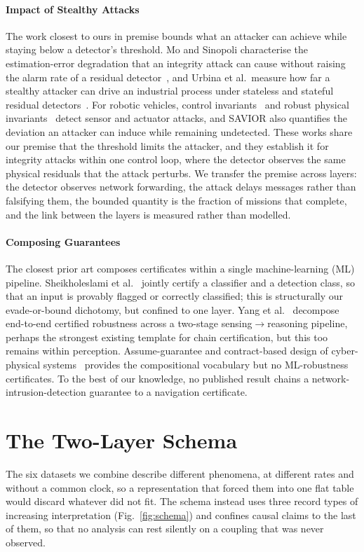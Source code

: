 \documentclass[conference,letterpaper,10pt]{IEEEtran}   %
\begin{document}
\paragraph{Impact of Stealthy Attacks}
The work closest to ours in premise bounds what an attacker can achieve while
staying below a detector's threshold. Mo and Sinopoli characterise the
estimation-error degradation that an integrity attack can cause without raising
the alarm rate of a residual detector~\cite{mo2016}, and Urbina et
al.\ measure how far a stealthy attacker can drive an industrial process under
stateless and stateful residual detectors~\cite{urbina2016}. For robotic
vehicles, control invariants~\cite{choi2018} and robust physical
invariants~\cite{quinonez2020savior} detect sensor and actuator attacks, and
SAVIOR also quantifies the deviation an attacker can induce while remaining
undetected. These works share our premise that the threshold limits the
attacker, and they establish it for integrity attacks within one control loop,
where the detector observes the same physical residuals that the attack
perturbs. We transfer the premise across layers: the detector observes network
forwarding, the attack delays messages rather than falsifying them, the bounded
quantity is the fraction of missions that complete, and the link between the
layers is measured rather than modelled.

\paragraph{Composing Guarantees}
The closest prior art composes certificates within a single machine-learning
(ML) pipeline.
Sheikholeslami et al.~\cite{sheikholeslami2021provably} jointly certify a
classifier and a detection class, so that an input is provably flagged or
correctly classified; this is structurally our evade-or-bound dichotomy, but
confined to one layer. Yang et al.~\cite{yang2022sensing} decompose end-to-end
certified robustness across a two-stage sensing$\to$reasoning pipeline, perhaps
the strongest existing template for chain certification, but this too remains
within perception. Assume-guarantee and contract-based design of
cyber-physical systems~\cite{pacti2024} provides the compositional vocabulary
but no ML-robustness certificates. To the best of our knowledge, no published
result chains a network-intrusion-detection guarantee to a navigation
certificate.

\section{The Two-Layer Schema}
\label{sec:schema}
The six datasets we combine describe different phenomena, at different rates
and without a common clock, so a representation that forced them into one flat
table would discard whatever did not fit. The schema instead uses three record
types of increasing interpretation (Fig.~\ref{fig:schema}) and confines causal
claims to the last of them, so that no analysis can rest silently on a coupling
that was never observed.
\end{document}
